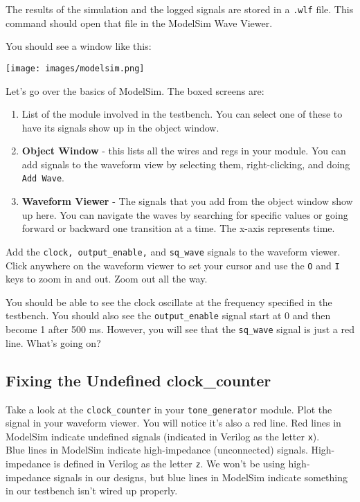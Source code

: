 \documentclass[11pt]{article}
\begin{document}
The results of the simulation and the logged signals are stored in a \verb|.wlf| file. This command should open that file in the ModelSim Wave Viewer.

You should see a window like this:

\texttt{[image: images/modelsim.png]}

Let's go over the basics of ModelSim. The boxed screens are:

\begin{enumerate}
	\item List of the module involved in the testbench. You can select one of these to have its signals show up in the object window.
	\item \textbf{Object Window} - this lists all the wires and regs in your module. You can add signals to the waveform view by selecting them, right-clicking, and doing \verb|Add Wave|.
	\item \textbf{Waveform Viewer} - The signals that you add from the object window show up here. You can navigate the waves by searching for specific values or going forward or backward one transition at a time. The x-axis represents time.
\end{enumerate}

Add the \verb|clock, output_enable,| and \verb|sq_wave| signals to the waveform viewer. Click anywhere on the waveform viewer to set your cursor and use the \verb|O| and \verb|I| keys to zoom in and out. Zoom out all the way.

You should be able to see the clock oscillate at the frequency specified in the testbench. You should also see the \verb|output_enable| signal start at 0 and then become 1 after 500 ms. However, you will see that the \verb|sq_wave| signal is just a red line. What's going on?

\subsection{Fixing the Undefined clock\_counter}

Take a look at the \verb|clock_counter| in your \verb|tone_generator| module. Plot the signal in your waveform viewer. You will notice it's also a red line. Red lines in ModelSim indicate undefined signals (indicated in Verilog as the letter \verb|x|). \\

Blue lines in ModelSim indicate high-impedance (unconnected) signals. High-impedance is defined in Verilog as the letter \verb|z|. We won't be using high-impedance signals in our designs, but blue lines in ModelSim indicate something in our testbench isn't wired up properly.\\
\end{document}
